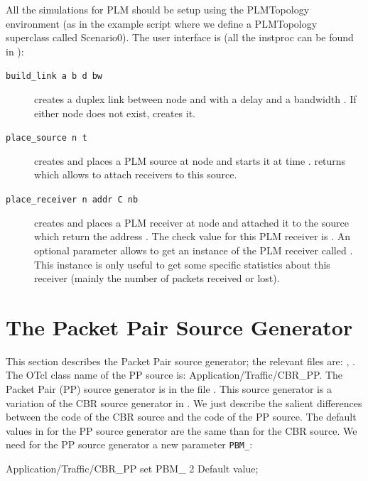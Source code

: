 {All the simulations for PLM should be setup using the PLMTopology environment (as
in the example script where we define a PLMTopology superclass called Scenario0). The
user interface is (all the instproc can be found in ):
\begin{description}
\item[\tt build\_link a b d bw] creates a duplex link between node
   and  with a delay  and a bandwidth . If
  either node does not exist,  creates it.
\item[\tt place\_source n t] creates and places a PLM source at node  and
  starts it at time .  returns  which
  allows to attach receivers to this source.
\item[\tt place\_receiver n addr C nb] creates and places a PLM receiver at node
   and attached it to the source which return the address . The
  check value for this PLM receiver is . An optional parameter 
  allows to get an instance of the PLM receiver called . This
  instance is only useful to get some specific statistics about this receiver
  (mainly the number of packets received or lost). %
\end{description}




\section{The Packet Pair Source Generator}
This section describes the Packet Pair source generator; the relevant files are:
, . The OTcl class name of
the PP source is: Application/Traffic/CBR\_PP. 
The Packet Pair (PP) source generator is in the file
. This source 
generator is a variation of the CBR source generator in .
We just describe the salient differences between the code of
the CBR source and the code of the PP source. 
The default values in  for the PP source generator are the same
than for the CBR source. We need for the PP source generator a new parameter {\tt PBM\_}:
\begin{program}
Application/Traffic/CBR_PP set PBM_ 2 \;Default value;
\end{program}

}
